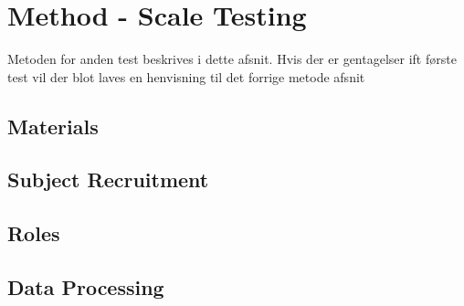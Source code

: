 \section{{\color{red}Method - Scale Testing}}
\label{MethodScaleTesting}
%
{\color{red} Metoden for anden test beskrives i dette afsnit. Hvis der er gentagelser ift første test vil der blot laves en henvisning til det forrige metode afsnit}
%
\subsection{Materials}
\subsection{Subject Recruitment}
\subsection{Roles}
\subsection{Data Processing}